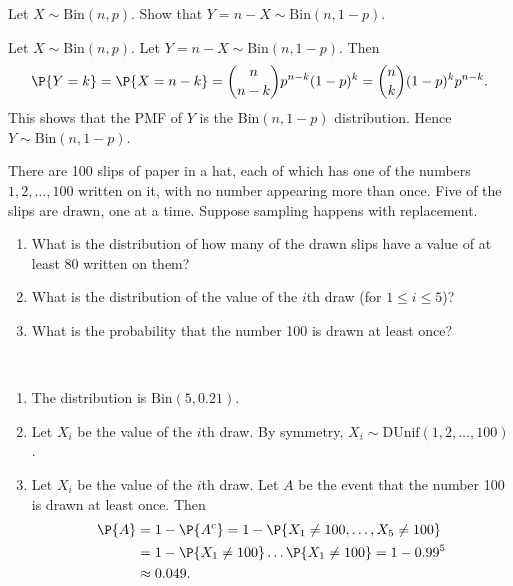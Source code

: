 \begin{exercise}
	Let $X \sim \text{Bin}(n, p)$. Show that $Y = n - X \sim \text{Bin}(n, 1 - p)$.
	\begin{solution}
	 	Let $X \sim \text{Bin}(n, p)$. Let $Y = n - X \sim \text{Bin}(n, 1 - p)$. Then
	 	\begin{equation*}
	 		\P{Y = k} = \P{X = n - k} = \binom{n}{n - k} p^{n - k} (1 - p)^k = \binom{n}{k}	 (1 - p)^k p^{n - k}.
	 	\end{equation*}
	 	This shows that the PMF of $Y$ is the $\text{Bin}(n, 1 - p)$ distribution. Hence $Y \sim \text{Bin}(n, 1 - p)$.
	\end{solution}
\end{exercise}

\begin{exercise}\label{ex:chap03:08}
	There are 100 slips of paper in a hat, each of which has one of the numbers $1,2, \ldots, 100$ written on it, with no number appearing more than once. Five of the slips are drawn, one at a time. Suppose sampling happens with replacement.
	\begin{enumerate}
		\item What is the distribution of how many of the drawn slips have a value of at least 80 written on them?
		\item What is the distribution of the value of the $i$th draw (for $1 \leq i \leq 5$)?
		\item What is the probability that the number 100 is drawn at least once?
	\end{enumerate}
	\begin{solution}~
	 	\begin{enumerate}
	 		\item The distribution is $\text{Bin}(5, 0.21)$.
	 		\item Let $X_i$ be the value of the $i$th draw. By symmetry, $X_i \sim \text{DUnif}(1, 2, \ldots, 100)$.
	 		\item Let $X_i$ be the value of the $i$th draw. Let $A$ be the event that the number 100 is drawn at least once. Then
	 		\begin{align*}
	 			\P{A} & = 1 - \P{A^c} = 1 - \P{X_1 \neq 100, \ldots, X_5 \neq 100} \\
	 			& = 1 - \P{X_1 \neq 100} \ldots \P{X_1 \neq 100} = 1 - 0.99^5 \\
	 			& \approx 0.049.
	 		\end{align*}
	 	\end{enumerate}
	\end{solution}
\end{exercise}
	 
